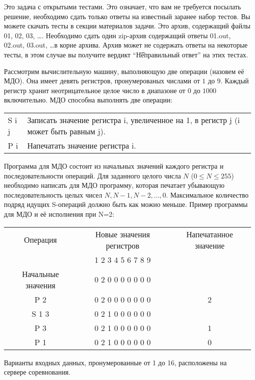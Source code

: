 Это задача с открытыми тестами. Это означает, что вам не требуется посылать решение, необходимо сдать только ответы на известный заранее набор тестов. Вы можете скачать тесты в секции материалов задачи. Это архив, содержащий файлы 01, 02, 03, \dots. Необходимо сдать один zip-архив содержащий ответы 01.out, 02.out, 03.out, \dots в корне архива. Архив может не содержать ответы на некоторые тесты, в этом случае вы получите вердикт ``\t{Неправильный ответ}'' на этих тестах.

Рассмотрим вычислительную машину, выполняющую две операции (назовем её
МДО). Она имеет девять регистров, пронумерованых числами от $1$ до $9$. Каждый
регистр хранит неотрицательное целое число в диапазоне от $0$ до $1000$ 
включительно. МДО способна выполнять две операции: 

\begin{tabular}{ll}
S i j & Записать значение регистра i, увеличенное на 1, в регистр j
(i может быть равным j). \\
P i & Напечатать значение регистра i. 
\end{tabular}

Программа для МДО состоит из начальных значений каждого регистра и
последовательности операций. Для заданного целого числа $N$ ($0 \le N \le 255$) 
необходимо написать для МДО программу, которая печатает убывающую
последовательность целых чисел $N, N-1, N-2, \ldots, 0$. Максимальное количество
подряд идущих S-операций должно быть как можно меньше. 
Пример программы для МДО и её исполнения при N=2: 

\begin{tabular}{|c|c|c|}
\hline
Операция & Новые значения регистров & Напечатанное значение \\
& 1 2 3 4 5 6 7 8 9 &  \\ \hline
Начальные значения & 0 2 0 0 0 0 0 0 0 & \\ \hline
P 2 & 0 2 0 0 0 0 0 0 0 & 2 \\ \hline
S 1 3 & 0 2 1 0 0 0 0 0 0 & \\ \hline
P 3 & 0 2 1 0 0 0 0 0 0 & 1 \\ \hline
P 1 & 0 2 1 0 0 0 0 0 0 & 0 \\ \hline
\end{tabular}


Варианты входных данных, пронумерованные от 1 до 16, расположены на сервере
соревнования. 
